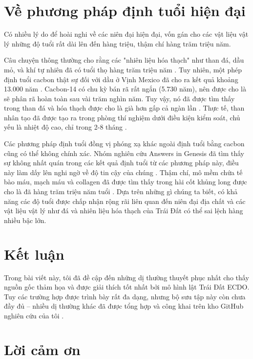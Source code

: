 \documentclass[10pt,twocolumn,letterpaper]{article}
\begin{document}
\section{Về phương pháp định tuổi hiện đại}

Có nhiều lý do để hoài nghi về các niên đại hiện đại, vốn gán cho các vật liệu vật lý những độ tuổi rất dài lên đến hàng triệu, thậm chí hàng trăm triệu năm.

Câu chuyện thông thường cho rằng các "nhiên liệu hóa thạch" như than đá, dầu mỏ, và khí tự nhiên đã có tuổi thọ hàng trăm triệu năm \cite{104}. Tuy nhiên, một phép định tuổi cacbon thật sự đối với dầu ở Vịnh Mexico đã cho ra kết quả khoảng 13.000 năm \cite{105}. Cacbon-14 có chu kỳ bán rã rất ngắn (5.730 năm), nên được cho là sẽ phân rã hoàn toàn sau vài trăm nghìn năm. Tuy vậy, nó đã được tìm thấy trong than đá và hóa thạch được cho là già hơn gấp cả ngàn lần \cite{106}. Thực tế, than nhân tạo đã được tạo ra trong phòng thí nghiệm dưới điều kiện kiểm soát, chủ yếu là nhiệt độ cao, chỉ trong 2-8 tháng \cite{107}.

Các phương pháp định tuổi đồng vị phóng xạ khác ngoài định tuổi bằng cacbon cũng có thể không chính xác. Nhóm nghiên cứu Answers in Genesis đã tìm thấy sự không nhất quán trong các kết quả định tuổi từ các phương pháp này, điều này làm dấy lên nghi ngờ về độ tin cậy của chúng \cite{108}. Thậm chí, mô mềm chứa tế bào máu, mạch máu và collagen đã được tìm thấy trong hài cốt khủng long được cho là đã hàng trăm triệu năm tuổi \cite{109,110}. Dựa trên những gì chúng ta biết, có khả năng các độ tuổi được chấp nhận rộng rãi liên quan đến niên đại địa chất và các vật liệu vật lý như đá và nhiên liệu hóa thạch của Trái Đất có thể sai lệch hàng nhiều bậc lớn.

\section{Kết luận}

Trong bài viết này, tôi đã đề cập đến những dị thường thuyết phục nhất cho thấy nguồn gốc thảm họa và được giải thích tốt nhất bởi mô hình lật Trái Đất ECDO. Tuy các trường hợp được trình bày rất đa dạng, nhưng bộ sưu tập này còn chưa đầy đủ – nhiều dị thường khác đã được tổng hợp và công khai trên kho GitHub nghiên cứu của tôi \cite{2}.

\section{Lời cảm ơn}
\end{document}

